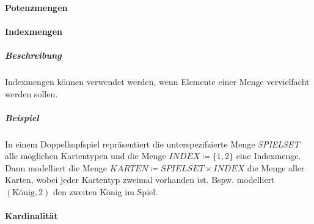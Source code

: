 
\paragraph{Potenzmengen}

\paragraph{Indexmengen}
\subparagraph{Beschreibung}
Indexmengen können verwendet werden, wenn Elemente einer Menge vervielfacht werden sollen.

\subparagraph{Beispiel}
	In einem Doppelkopfspiel repräsentiert die unterspezifzierte Menge \textit{SPIELSET} alle möglichen Kartentypen und die Menge $ \textit{INDEX} \coloneqq \{ 1, 2 \} $ eine Indexmenge. Dann modelliert die Menge $ \textit{KARTEN} \coloneqq \textit{SPIELSET} \times \textit{INDEX} $ die Menge aller Karten, wobei jeder Kartentyp zweimal vorhanden ist. Bspw. modelliert $ (\text{König}, 2) $ den zweiten König im Spiel.


\paragraph{Kardinalität}

